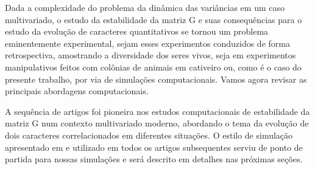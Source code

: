 
Dada a complexidade do problema da dinâmica das variâncias em um caso
multivariado, o estudo da estabilidade da matriz G e suas consequências
para o estudo da evolução de caracteres quantitativos se tornou um
problema eminentemente experimental, sejam esses experimentos conduzidos
de forma retrospectiva, amostrando a diversidade dos seres vivos, seja
em experimentos manipulativos feitos com colônias de animais em
cativeiro ou, como é o caso do presente trabalho, por via de simulações
computacionais. 
Vamos agora revisar as principais abordagens computacionais. 

A sequência de artigos \cite{Jones2003, Jones2004, Jones2007} foi
pioneira nos estudos computacionais de estabilidade da matriz G num
contexto multivariado moderno, abordando o tema da evolução de dois
caracteres correlacionados em diferentes situações. 
O estilo de simulação apresentado em \cite{Jones2003} e utilizado em
todos os artigos subsequentes serviu de ponto de partida para nossas
simulações e será descrito em detalhes nas próximas seções. 

